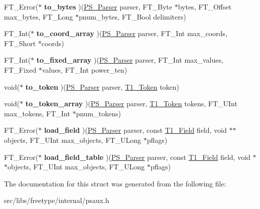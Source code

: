 \begin{DoxyCompactItemize}
\item 
\hypertarget{struct_p_s___parser___funcs_rec___abbda6afe648361ec1efa535fc853ce54}{
FT\_\-Error($\ast$ {\bfseries to\_\-bytes} )(\hyperlink{struct_p_s___parser_rec__}{PS\_\-Parser} parser, FT\_\-Byte $\ast$bytes, FT\_\-Offset max\_\-bytes, FT\_\-Long $\ast$pnum\_\-bytes, FT\_\-Bool delimiters)}
\label{struct_p_s___parser___funcs_rec___abbda6afe648361ec1efa535fc853ce54}

\item 
\hypertarget{struct_p_s___parser___funcs_rec___a11da5ac33187bc7b67696a9d24f3d239}{
FT\_\-Int($\ast$ {\bfseries to\_\-coord\_\-array} )(\hyperlink{struct_p_s___parser_rec__}{PS\_\-Parser} parser, FT\_\-Int max\_\-coords, FT\_\-Short $\ast$coords)}
\label{struct_p_s___parser___funcs_rec___a11da5ac33187bc7b67696a9d24f3d239}

\item 
\hypertarget{struct_p_s___parser___funcs_rec___a5b9316c7a5459857da99f6158afdf3d9}{
FT\_\-Int($\ast$ {\bfseries to\_\-fixed\_\-array} )(\hyperlink{struct_p_s___parser_rec__}{PS\_\-Parser} parser, FT\_\-Int max\_\-values, FT\_\-Fixed $\ast$values, FT\_\-Int power\_\-ten)}
\label{struct_p_s___parser___funcs_rec___a5b9316c7a5459857da99f6158afdf3d9}

\item 
\hypertarget{struct_p_s___parser___funcs_rec___ad963b97fac4a1ae52f4a68e693f39907}{
void($\ast$ {\bfseries to\_\-token} )(\hyperlink{struct_p_s___parser_rec__}{PS\_\-Parser} parser, \hyperlink{struct_t1___token_rec__}{T1\_\-Token} token)}
\label{struct_p_s___parser___funcs_rec___ad963b97fac4a1ae52f4a68e693f39907}

\item 
\hypertarget{struct_p_s___parser___funcs_rec___ac3cb6fd9c5eb16d8d853fa02e57602c2}{
void($\ast$ {\bfseries to\_\-token\_\-array} )(\hyperlink{struct_p_s___parser_rec__}{PS\_\-Parser} parser, \hyperlink{struct_t1___token_rec__}{T1\_\-Token} tokens, FT\_\-UInt max\_\-tokens, FT\_\-Int $\ast$pnum\_\-tokens)}
\label{struct_p_s___parser___funcs_rec___ac3cb6fd9c5eb16d8d853fa02e57602c2}

\item 
\hypertarget{struct_p_s___parser___funcs_rec___a1e3a763197f876746bc053bee27a3b86}{
FT\_\-Error($\ast$ {\bfseries load\_\-field} )(\hyperlink{struct_p_s___parser_rec__}{PS\_\-Parser} parser, const \hyperlink{struct_t1___field_rec__}{T1\_\-Field} field, void $\ast$$\ast$objects, FT\_\-UInt max\_\-objects, FT\_\-ULong $\ast$pflags)}
\label{struct_p_s___parser___funcs_rec___a1e3a763197f876746bc053bee27a3b86}

\item 
\hypertarget{struct_p_s___parser___funcs_rec___ac925f8b8b583c22717da0475a2427863}{
FT\_\-Error($\ast$ {\bfseries load\_\-field\_\-table} )(\hyperlink{struct_p_s___parser_rec__}{PS\_\-Parser} parser, const \hyperlink{struct_t1___field_rec__}{T1\_\-Field} field, void $\ast$$\ast$objects, FT\_\-UInt max\_\-objects, FT\_\-ULong $\ast$pflags)}
\label{struct_p_s___parser___funcs_rec___ac925f8b8b583c22717da0475a2427863}

\end{DoxyCompactItemize}


The documentation for this struct was generated from the following file:\begin{DoxyCompactItemize}
\item 
src/libs/freetype/internal/psaux.h\end{DoxyCompactItemize}
